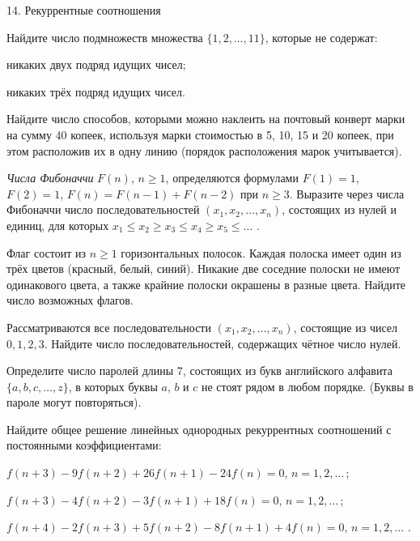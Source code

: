 



\biLangHeader
{14.}
{Рекуррентные соотношения}

\begin{problemList}

\problemItemSimple
{}
{Найдите число подмножеств множества $\{1, 2, \ldots, 11\}$, которые
не содержат:
\begin{belarusianEnumerate}
  \item никаких двух подряд идущих чисел;
  \item никаких трёх подряд идущих чисел.
\end{belarusianEnumerate}}

\problemItemSimple
{}
{Найдите число способов, которыми можно наклеить на почтовый конверт
марки на сумму 40 копеек, используя марки стоимостью в 5, 10, 15 и 20 копеек,
при этом расположив их в одну линию (порядок расположения марок учитывается).}

\problemItemSimple
{}
{\emph{Числа Фибоначчи} $F(n)$, $n \ge 1$, определяются формулами
$F(1) = 1$, $F(2) = 1$, $F(n) = F(n - 1) + F(n - 2)$ при $n \ge 3$. Выразите
через числа Фибоначчи число последовательностей $(x_1, x_2, \ldots, x_n)$,
состоящих из нулей и единиц, для которых
$x_1 \le x_2 \ge x_3 \le x_4 \ge x_5 \le \ldots\,\,$.}

\problemItemSimple
{}
{Флаг состоит из $n \ge 1$ горизонтальных полосок. Каждая полоска
имеет один из трёх цветов (красный, белый, синий). Никакие две соседние полоски
не имеют одинакового цвета, а также крайние полоски окрашены в разные цвета.
Найдите число возможных флагов.}

\problemItemSimple
{}
{Рассматриваются все последовательности $(x_1, x_2, \ldots, x_n)$,
состоящие из чисел $0, 1, 2, 3$. Найдите число последовательностей,
содержащих чётное число нулей.}

\problemItemSimple
{}
{Определите число паролей длины 7, состоящих из букв английского
алфавита $\{a, b, c, \ldots, z\}$, в которых буквы $a$, $b$ и $c$ не
стоят рядом в любом порядке. (Буквы в пароле могут повторяться).}

\problemItemWithCommonPart
{}
{Найдите общее решение линейных однородных рекуррентных соотношений с
постоянными коэффициентами:}
{\begin{belarusianEnumerate}
  \item $f(n + 3) - 9f(n + 2) + 26f(n + 1) - 24f(n) = 0$, $n = 1, 2, \ldots\, $;
  \item $f(n + 3) - 4f(n + 2) - 3f(n + 1) + 18f(n) = 0$, $n = 1, 2, \ldots\, $;
  \item $f(n + 4) - 2f(n + 3) + 5f(n + 2) - 8f(n + 1) + 4f(n) = 0$, $n = 1, 2, \ldots\,\, $.
\end{belarusianEnumerate}}

\end{problemList}


